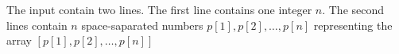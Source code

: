 The input contain two lines.
The first line contains one integer $n$.
The second lines contain $n$ space-saparated numbers 
$p[1],p[2],\dots,p[n]$ representing 
the array $[p[1], p[2],\dots, p[n]]$
